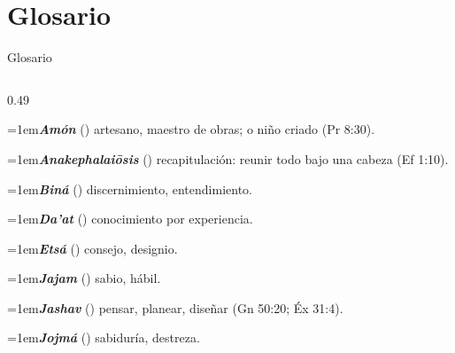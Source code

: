 \section{Glosario}

\begin{frame}{Glosario}
\scriptsize\RaggedRight
\begin{columns}[t,onlytextwidth]
\begin{column}{0.49\textwidth}

\par\noindent\hangindent=1em{\color{azul}\textbf{\emph{Amón}}} () artesano, maestro de obras; o niño criado (Pr 8:30).\par\vspace{2pt}
\par\noindent\hangindent=1em{\color{azul}\textbf{\emph{Anakephalaiōsis}}} () recapitulación: reunir todo bajo una cabeza (Ef 1:10).\par\vspace{2pt}
\par\noindent\hangindent=1em{\color{azul}\textbf{\emph{Biná}}} () discernimiento, entendimiento.\par\vspace{2pt}
\par\noindent\hangindent=1em{\color{azul}\textbf{\emph{Da'at}}} () conocimiento por experiencia.\par\vspace{2pt}
\par\noindent\hangindent=1em{\color{azul}\textbf{\emph{Etsá}}} () consejo, designio.\par\vspace{2pt}
\par\noindent\hangindent=1em{\color{azul}\textbf{\emph{Jajam}}} () sabio, hábil.\par\vspace{2pt}
\par\noindent\hangindent=1em{\color{azul}\textbf{\emph{Jashav}}} () pensar, planear, diseñar (Gn 50:20; Éx 31:4).\par\vspace{2pt}
\par\noindent\hangindent=1em{\color{azul}\textbf{\emph{Jojmá}}} () sabiduría, destreza.\par\vspace{2pt}


\end{column}
\end{columns}
\end{frame}
